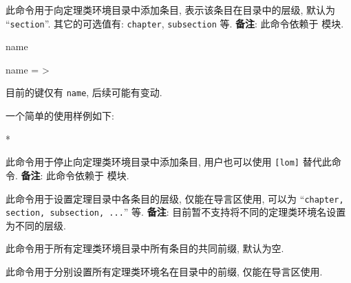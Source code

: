 \begin{function}[updated=2025-04-25]{\zthmtocadd}
  \begin{syntax}
  \end{syntax}
  此命令用于向定理类环境目录中添加条目,  表示该条目在目录中的层级,  默认为 ``\texttt{section}''. 其它的可选值有: \texttt{chapter}, \texttt{subsection} 等.
  \textbf{备注}: 此命令依赖于  模块.
\end{function}

\begin{keyval}[parent=..]{name}
  \begin{syntax}
    name = >
  \end{syntax}
  目前的键仅有 \texttt{name}, 后续可能有变动.
\end{keyval}
一个简单的使用样例如下:
\begin{DocExample}*
\end{DocExample}



\begin{function}[updated=2025-09-04]{\zthmtocstop}
  \begin{syntax}
  \end{syntax}
  此命令用于停止向定理类环境目录中添加条目, 用户也可以使用 \cmd{\ztocstop}\texttt{[lom]} 替代此命令. \textbf{备注}: 此命令依赖于  模块.
\end{function}



\begin{function}[updated=2025-04-25]{\zthmtoclevel}
  \begin{syntax}
  \end{syntax}
  此命令用于设置定理目录中各条目的层级, 仅能在导言区使用,  可以为 ``\texttt{chapter, section, subsection, ...}'' 等. \textbf{备注}: 目前暂不支持将不同的定理类环境名设置为不同的层级.
\end{function}


\begin{function}[updated=2025-04-25]{\zthmtocprefix}
  \begin{syntax}
  \end{syntax}
  此命令用于所有定理类环境目录中所有条目的共同前缀, 默认为空. 
\end{function}


\begin{function}[updated=2025-04-25]{\zthmtocsym}
  \begin{syntax}
  \end{syntax}
  此命令用于分别设置所有定理类环境名在目录中的前缀, 仅能在导言区使用.
\end{function}


